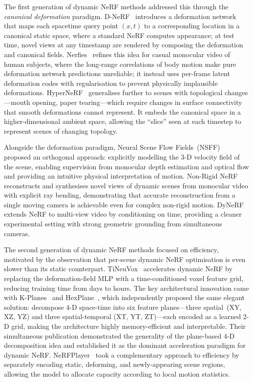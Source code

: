 The first generation of dynamic NeRF methods addressed this through the
\emph{canonical deformation} paradigm.
D-NeRF~\citep{pumarola2021dnerf} introduces a deformation network that maps
each spacetime query point $(x,t)$ to a corresponding location in a canonical
static space, where a standard NeRF computes appearance; at test time, novel
views at any timestamp are rendered by composing the deformation and canonical
fields.
Nerfies~\citep{park2021nerfies} refines this idea for casual monocular video
of human subjects, where the long-range correlations of body motion make
pure deformation network predictions unreliable; it instead uses per-frame
latent deformation codes with regularisation to prevent physically implausible
deformations.
HyperNeRF~\citep{park2021hypernerf} generalises further to scenes with
topological changes---mouth opening, paper tearing---which require changes
in surface connectivity that smooth deformations cannot represent.
It embeds the canonical space in a higher-dimensional ambient space, allowing
the ``slice'' seen at each timestep to represent scenes of changing topology.

Alongside the deformation paradigm, Neural Scene Flow Fields~(NSFF)~\citep{li2021neural_scene_flow}
proposed an orthogonal approach: explicitly modelling the 3-D velocity field
of the scene, enabling supervision from monocular depth estimation and optical
flow and providing an intuitive physical interpretation of motion.
Non-Rigid NeRF~\citep{tretschk2021nonrigid} reconstructs and synthesises
novel views of dynamic scenes from monocular video with explicit ray bending,
demonstrating that accurate reconstruction from a single moving camera is
achievable even for complex non-rigid motion.
DyNeRF~\citep{li2022neural3d} extends NeRF to multi-view video by conditioning
on time, providing a cleaner experimental setting with strong geometric
grounding from simultaneous cameras.

The second generation of dynamic NeRF methods focused on efficiency, motivated
by the observation that per-scene dynamic NeRF optimisation is even slower
than its static counterpart.
TiNeuVox~\citep{fang2022tineuvox} accelerates dynamic NeRF by replacing the
deformation-field MLP with a time-conditioned voxel feature grid, reducing
training time from days to hours.
The key architectural innovation came with K-Planes~\citep{fridovich2023kplanes}
and HexPlane~\citep{cao2023hexplane}, which independently proposed the same
elegant solution: decompose 4-D space-time into six
feature planes---three spatial~(XY, XZ, YZ) and three spatial-temporal
(XT, YT, ZT)---each encoded as a learned 2-D grid, making the architecture
highly memory-efficient and interpretable.
Their simultaneous publication demonstrated the generality of the plane-based
4-D decomposition idea and established it as the dominant acceleration paradigm
for dynamic NeRF.
NeRFPlayer~\citep{song2023nerfplayer} took a complementary approach to efficiency
by separately encoding static, deforming, and newly-appearing scene regions,
allowing the model to allocate capacity according to local motion statistics.

